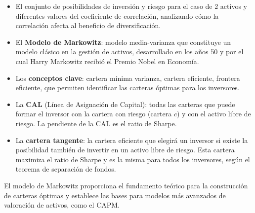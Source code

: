 \begin{itemize}
\item El conjunto de posibilidades de inversión y riesgo para el caso de 2 activos y diferentes valores del coeficiente de correlación, analizando cómo la correlación afecta al beneficio de diversificación.

\item El \textbf{Modelo de Markowitz}: modelo media-varianza que constituye un modelo clásico en la gestión de activos, desarrollado en los años 50 y por el cual Harry Markowitz recibió el Premio Nobel en Economía.

\item Los \textbf{conceptos clave}: cartera mínima varianza, cartera eficiente, frontera eficiente, que permiten identificar las carteras óptimas para los inversores.

\item La \textbf{CAL} (Línea de Asignación de Capital): todas las carteras que puede formar el inversor con la cartera con riesgo (cartera $c$) y con el activo libre de riesgo. La pendiente de la CAL es el ratio de Sharpe.

\item La \textbf{cartera tangente}: la cartera eficiente que elegirá un inversor si existe la posibilidad también de invertir en un activo libre de riesgo. Esta cartera maximiza el ratio de Sharpe y es la misma para todos los inversores, según el teorema de separación de fondos.
\end{itemize}

El modelo de Markowitz proporciona el fundamento teórico para la construcción de carteras óptimas y establece las bases para modelos más avanzados de valoración de activos, como el CAPM.



